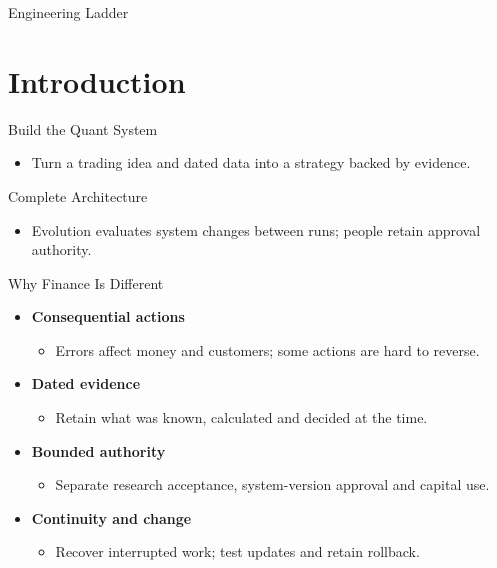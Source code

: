 \begin{frame}{Engineering Ladder}
\begin{center}
\resizebox{!}{6.6cm}{}
\end{center}
\end{frame}

\section{Introduction}
\begin{frame}{Build the Quant System}
\begin{center}
\resizebox{.94\textwidth}{!}{}
\end{center}
\begin{itemize}
\item Turn a trading idea and dated data into a strategy backed by evidence.
\end{itemize}
\end{frame}

\begin{frame}[t]{Complete Architecture}
\centering
\resizebox{!}{6.0cm}{}
\par\raggedright\smallskip
\begin{itemize}
\item Evolution evaluates system changes between runs; people retain approval authority.
\end{itemize}
\end{frame}

\begin{frame}{Why Finance Is Different}
\begin{itemize}
\item \textbf{Consequential actions}
\begin{itemize}
\item Errors affect money and customers; some actions are hard to reverse.
\end{itemize}
\item \textbf{Dated evidence}
\begin{itemize}
\item Retain what was known, calculated and decided at the time.
\end{itemize}
\item \textbf{Bounded authority}
\begin{itemize}
\item Separate research acceptance, system-version approval and capital use.
\end{itemize}
\item \textbf{Continuity and change}
\begin{itemize}
\item Recover interrupted work; test updates and retain rollback.
\end{itemize}
\end{itemize}
\end{frame}

